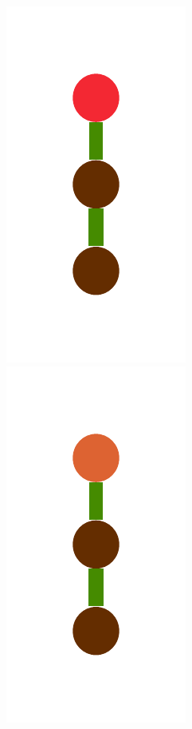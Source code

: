 \documentclass[a4paper,10pt]{article}
\begin{document}
\begin{figure}[t]
\includegraphics[scale=.26]{./figures/4-2-4-constructor-induction-pre-2.pdf}
\includegraphics[scale=.26]{./figures/4-2-4-constructor-induction-pre-3.pdf}

\end{figure}
\end{document}
